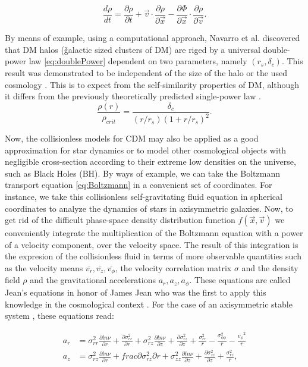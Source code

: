 \begin{equation}
\frac{d\rho}{dt} = \frac{\partial \rho}{\partial t} +\vec{v}\cdot\frac{\partial\rho}{\partial \vec{x}}
-\frac{\partial \Phi}{\partial \vec{x}}\cdot\frac{\partial\rho}{\partial \vec{v}}.
\label{eq:Boltzmann}
\end{equation}

   
By means of example, using a computational approach, Navarro et al. discovered that DM halos (\~ galactic sized clusters of DM) are riged by a universal double-power law \eqref{eq:doublePower} dependent on two parameters, namely $(r_s,\delta_c)$. This result was demonstrated to be independent of the size of the halo or the used cosmology \cite{Navarro PowerLaw}. This is to expect from the self-similarity properties of DM, although it differs from the previously theoretically predicted single-power law  \cite{White-Zaritsky}.\\

\begin{equation}
\frac{\rho(r)}{\rho_{crit}} = \frac{\delta_c}{(r/r_s)(1+r/r_s)^2}.
\label{eq:doublePower}
\end{equation}

Now, the collisionless models for CDM may also be applied as a good approximation for star dynamics or to model other cosmological objects with negligible cross-section according to their extreme low densities on the universe, such as Black Holes (BH). By ways of example, we can take the Boltzmann transport equation \eqref{eq:Boltzmann} in a convenient set of coordinates. For instance, we take this collisionless self-gravitating fluid equation in spherical coordinates to analyze the dynamics of stars in axisymmetric galaxies. Now, to get rid of the difficult phase-space density distribution function $f(\vec{x},\vec{v})$ we conveniently integrate the multiplication of the Boltzmann equation with a power of a velocity component, over the velocity space. The result of this integration is the expresion of the collisionless fluid in terms of more observable quantities such as the velocity means $\overline{v_r},\overline{v_z},\overline{v_\phi}$, the velocity correlation matrix $\sigma$ and the density field $\rho$ and the gravitational accelerations $a_r,a_z,a_\phi$. These equations are called Jean's equations in honor of James Jean who was the first to apply this knowledge in the cosmological context \cite{Jeans}. For the case of an axisymmetric stable system \cite{Loebman}, these equations read:  

\begin{align}
a_r & = \sigma^2_{rr} \frac{\partial ln \nu}{\partial r} + \frac{\partial \sigma^2_{rr} }{\partial r} + \sigma^2_{rz} \frac{\partial ln \nu}{\partial z} + \frac{\partial \sigma^2_{rz} }{\partial z} +  \frac{\sigma^2_{rr}}{r}-\frac{\sigma^2_{\phi\phi}}{r}-\frac{\overline{v_\phi}^2}{r}\\
a_z & =  \sigma^2_{rz} \frac{\partial ln \nu}{\partial r} + frac{\partial \sigma^2_{rz} }{\partial r} + \sigma^2_{zz}\frac{\partial ln \nu}{\partial z} + \frac{\partial \sigma^2_{zz} }{\partial z} +  \frac{\sigma^2_{rz}}{r},
\end{align}

